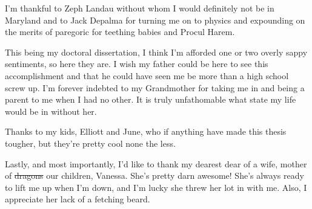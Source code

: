 I'm thankful to Zeph Landau without whom I would definitely not be in Maryland and to Jack Depalma for turning me on to physics and expounding on the merits of paregoric for teething babies and Procul Harem.

This being my doctoral dissertation, I think I'm afforded one or two overly sappy sentiments, so here they are. I wish my father could be here to see this accomplishment and that he could have seen me be more than a high school screw up. I'm forever indebted to my Grandmother for taking me in and being a parent to me when I had no other. It is truly unfathomable what state my life would be in without her. 

Thanks to my kids,  Elliott and June, who if anything have made this thesis tougher,  but they’re pretty cool none the less. 

Lastly, and most importantly, I'd like to thank my dearest dear of a wife, mother of \sout{dragons} our children, Vanessa. She's pretty darn awesome! She's always ready to lift me up when I'm down, and I'm lucky she threw her lot in with me. Also, I appreciate her lack of a fetching beard. 

